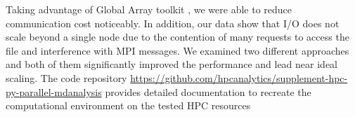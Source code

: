 Taking advantage of Global Array toolkit \cite{GA, GAiN}, we were able to reduce communication cost noticeably.
In addition, our data show that I/O does not scale beyond a single node due to the contention of many requests to access the file and interference with MPI messages. 
We examined two different approaches and both of them significantly improved the performance and lead near ideal scaling.
The code repository \url{https://github.com/hpcanalytics/supplement-hpc-py-parallel-mdanalysis} provides detailed documentation to recreate the computational environment on the tested HPC resources